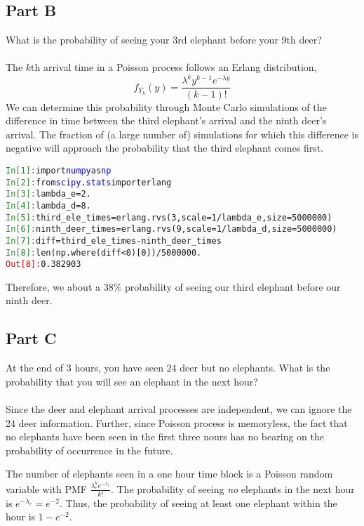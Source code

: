\documentclass{amsart}
\begin{document}
	\subsection{Part B}
	What is the probability of seeing your 3rd elephant before your 9th deer?\\
	\\
	The $k$th arrival time in a Poisson process follows an Erlang distribution,
	\[
	f_{Y_k}(y) = \frac{\lambda^k y^{k-1}e^{-\lambda y}}{(k-1)!}
	\]
	We can determine this probability through Monte Carlo simulations of the difference in time between the third elephant's arrival and the ninth deer's arrival. The fraction of (a large number of) simulations for which this difference is negative will approach the probability that the third elephant comes first.
	
	\begin{alltt}
	\textcolor{ForestGreen}{In [1]:} \textcolor{OliveGreen}{import} \textcolor{blue}{numpy} \textcolor{OliveGreen}{as} \textcolor{blue}{np}
	\textcolor{ForestGreen}{In [2]:} \textcolor{OliveGreen}{from} \textcolor{blue}{scipy.stats} \textcolor{OliveGreen}{import} erlang
	\textcolor{ForestGreen}{In [3]:} lambda_e = 2.
	\textcolor{ForestGreen}{In [4]:} lambda_d = 8.
	\textcolor{ForestGreen}{In [5]:} third_ele_times = erlang.rvs(3,scale=1/lambda_e,size=5000000)
	\textcolor{ForestGreen}{In [6]:} ninth_deer_times = erlang.rvs(9,scale=1/lambda_d,size=5000000)
	\textcolor{ForestGreen}{In [7]:} diff = third_ele_times - ninth_deer_times
	\textcolor{ForestGreen}{In [8]:} len(np.where(diff<0)[0])/5000000.
	\textcolor{red}{Out[8]:} 0.382903
	\end{alltt}

	Therefore, we about a 38\% probability of seeing our third elephant before our ninth deer.
	
	\subsection{Part C}
	At the end of 3 hours, you have seen 24 deer but no elephants. What is the probability that you will see an elephant in the next hour?\\
	\\
	Since the deer and elephant arrival processes are independent, we can ignore the 24 deer information. Further, since Poisson process is memoryless, the fact that no elephants have been seen in the first three nours has no bearing on the probability of occurrence in the future.
	
	The number of elephants seen in a one hour time block is a Poisson random variable with PMF $\frac{\lambda_e^k e^{-\lambda_e}}{k!}$. The probability of seeing \textit{no} elephants in the next hour is $e^{-\lambda_e} = e^{-2}$. Thus, the probability of seeing at least one elephant within the hour is $1-e^{-2}$.
	\\
\end{document}
